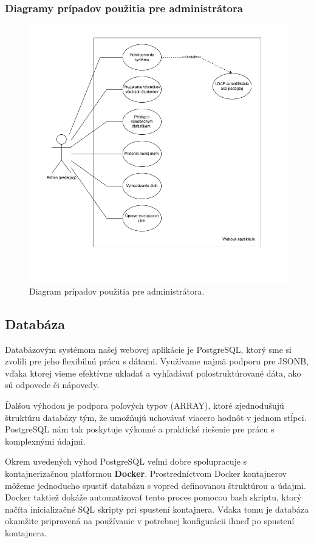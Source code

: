 \subsubsection{Diagramy prípadov použitia pre administrátora}
\begin{figure}[H]
  \centering
  \includegraphics[width=16cm]{img/diagram_admin.png}
  \caption{Diagram prípadov použitia pre administrátora.}
  \label{admindiagram}
\end{figure}



 \subsection{Databáza}
 Databázovým systémom našej webovej aplikácie je PostgreSQL, ktorý sme si zvolili pre jeho flexibilnú prácu s dátami. 
 Využívame najmä podporu pre JSONB, vďaka ktorej vieme efektívne ukladať a vyhľadávať polostruktúrované dáta, ako sú odpovede či nápovedy.

Ďalšou výhodou je podpora poľových typov (ARRAY), ktoré zjednodušujú štruktúru databázy tým, že umožňujú uchovávať viacero hodnôt v jednom stĺpci. 
PostgreSQL nám tak poskytuje výkonné a praktické riešenie pre prácu s komplexnými údajmi.

Okrem uvedených výhod PostgreSQL veľmi dobre spolupracuje s kontajnerizačnou platformou \textbf{Docker}.
Prostredníctvom Docker kontajnerov môžeme jednoducho spustiť databázu s vopred definovanou štruktúrou a údajmi.
Docker taktiež dokáže automatizovať tento proces pomocou bash skriptu, ktorý načíta inicializačné SQL skripty pri spustení kontajnera.
Vďaka tomu je databáza okamžite pripravená na používanie v potrebnej konfigurácii ihneď po spustení kontajnera.

